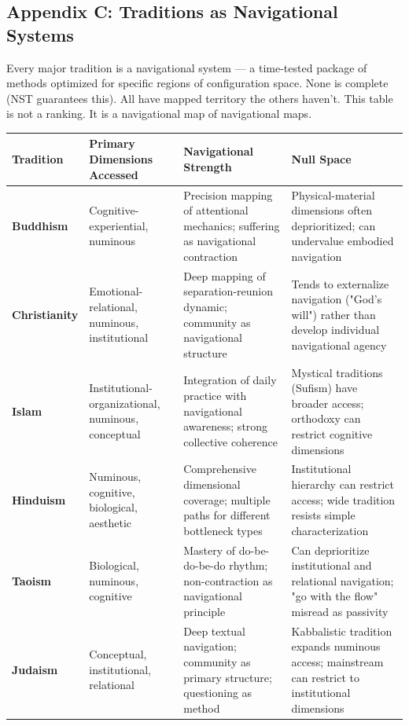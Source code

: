 \subsection*{Appendix C: Traditions as Navigational Systems}


Every major tradition is a navigational system — a time-tested package of methods optimized for specific regions of configuration space. None is complete (NST guarantees this). All have mapped territory the others haven't. This table is not a ranking. It is a navigational map of navigational maps.



\begin{longtable}{>{\raggedright\arraybackslash}p{} >{\raggedright\arraybackslash}p{} >{\raggedright\arraybackslash}p{} >{\raggedright\arraybackslash}p{}}
\toprule
\textbf{Tradition} & \textbf{Primary Dimensions Accessed} & \textbf{Navigational Strength} & \textbf{Null Space} \\
\midrule
\endhead
\textbf{Buddhism} & Cognitive-experiential, numinous & Precision mapping of attentional mechanics; suffering as navigational contraction & Physical-material dimensions often deprioritized; can undervalue embodied navigation \\
\textbf{Christianity} & Emotional-relational, numinous, institutional & Deep mapping of separation-reunion dynamic; community as navigational structure & Tends to externalize navigation ("God's will") rather than develop individual navigational agency \\
\textbf{Islam} & Institutional-organizational, numinous, conceptual & Integration of daily practice with navigational awareness; strong collective coherence & Mystical traditions (Sufism) have broader access; orthodoxy can restrict cognitive dimensions \\
\textbf{Hinduism} & Numinous, cognitive, biological, aesthetic & Comprehensive dimensional coverage; multiple paths for different bottleneck types & Institutional hierarchy can restrict access; wide tradition resists simple characterization \\
\textbf{Taoism} & Biological, numinous, cognitive & Mastery of do-be-do-be-do rhythm; non-contraction as navigational principle & Can deprioritize institutional and relational navigation; "go with the flow" misread as passivity \\
\textbf{Judaism} & Conceptual, institutional, relational & Deep textual navigation; community as primary structure; questioning as method & Kabbalistic tradition expands numinous access; mainstream can restrict to institutional dimensions \\

\end{longtable}
